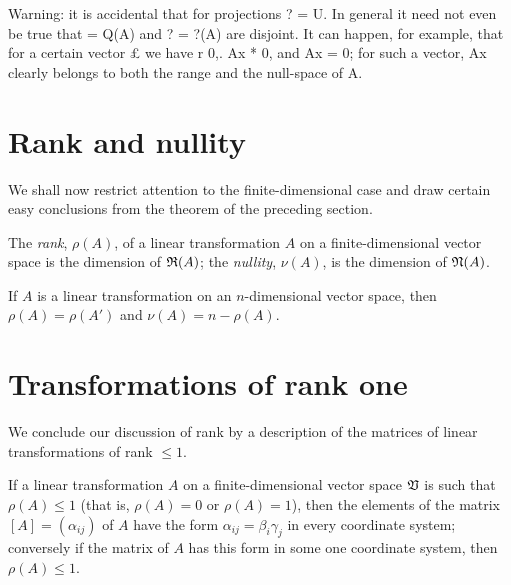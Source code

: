 Warning: it is accidental that for
projections  ? = U. In general it need not even be true that = Q(A) and ? = ?(A)
are disjoint. It can happen, for example, that for a certain vector £ we have r
0,. Ax * 0, and Ax = 0; for such a vector, Ax clearly belongs to both the range
and the null-space of A.

\section{Rank and nullity}


We shall now restrict attention to the finite-dimensional case and draw certain
easy conclusions from the theorem of the preceding section.

\begin{definition}
    The \emph{rank}, \(\rho(A)\), of a linear transformation \(A\) on a finite-dimensional vector space is the dimension of \(\frak{R}(A)\); the \emph{nullity}, \(\nu(A)\), is the dimension of \(\frak{N}(A)\).
\end{definition}

\begin{theorem}
    If \(A\) is a linear transformation on an \(n\)-dimensional vector space, then \(\rho(A) = \rho(A')\) and \(\nu(A) = n - \rho(A)\).
\end{theorem}


\section{Transformations of rank one}

We conclude our discussion of rank by a description of the matrices of linear
transformations of rank \(\leq 1\).

\begin{definition}
    If a linear transformation \(A\) on a finite-dimensional vector space
    \(\mathfrak{V}\) is such that \(\rho (A) \leq 1\) (that is, \(\rho(A) = 0\) or
    \(\rho (A) =1\)), then the elements of the matrix \([A] = (\alpha_{ij})\) of
    \(A\) have the form \(\alpha_{ij} = \beta_i \gamma_j\) in every coordinate
    system; conversely if the matrix of \(A\) has this form in some one
    coordinate system,  then \(\rho(A) \leq 1\).
\end{definition}

